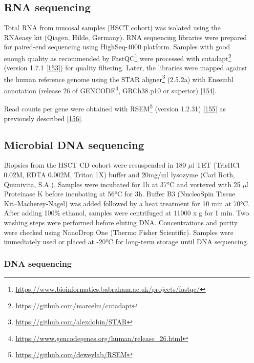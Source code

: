 \documentclass[
  a4paper,
]{book}
\DeclareRobustCommand{\href}[2]{#2\footnote{\url{#1}}}
\begin{document}
\hypertarget{rna-sequencing}{%
\subsection{RNA sequencing}\label{rna-sequencing}}

Total RNA from mucosal samples (HSCT cohort) was isolated using the RNAeasy kit (Qiagen, Hilde, Germany).
RNA sequencing libraries were prepared for paired-end sequencing using HighSeq-4000 platform.
Samples with good enough quality as recommended by \href{https://www.bioinformatics.babraham.ac.uk/projects/fastqc/}{FastQC} were processed with \href{https://github.com/marcelm/cutadapt}{cutadapt} (version 1.7.1 {[}\protect\hyperlink{ref-martin2011}{153}{]}) for quality filtering.
Later, the libraries were mapped against the human reference genome using the \href{https://github.com/alexdobin/STAR}{STAR aligner} (2.5.2a) with Ensembl annotation (\href{https://www.gencodegenes.org/human/release_26.html}{release 26 of GENCODE}, GRCh38.p10 or superior) {[}\protect\hyperlink{ref-dobin2013}{154}{]}.

Read counts per gene were obtained with \href{https://github.com/deweylab/RSEM}{RSEM} (version 1.2.31) {[}\protect\hyperlink{ref-li2011}{155}{]} as previously described {[}\protect\hyperlink{ref-corralizaDifferencesPeripheralTissue}{156}{]}.

\hypertarget{microbial-dna-sequencing}{%
\subsection{Microbial DNA sequencing}\label{microbial-dna-sequencing}}

Biopsies from the HSCT CD cohort were resuspended in 180 \(\mu\)l TET (TrisHCl 0.02M, EDTA 0.002M, Triton 1X) buffer and 20mg/ml lysozyme (Carl Roth, Quimivita, S.A.). Samples were incubated for 1h at 37°C and vortexed with 25 \(\mu\)l Proteinase K before incubating at 56°C for 3h.
Buffer B3 (NucleoSpin Tissue Kit--Macherey-Nagel) was added followed by a heat treatment for 10 min at 70°C.
After adding 100\% ethanol, samples were centrifuged at 11000 x g for 1 min.
Two washing steps were performed before eluting DNA.
Concentrations and purity were checked using NanoDrop One (Thermo Fisher Scientific).
Samples were immediately used or placed at -20°C for long-term storage until DNA sequencing.

\hypertarget{dna-sequencing}{%
\subsubsection{DNA sequencing}\label{dna-sequencing}}
\end{document}
